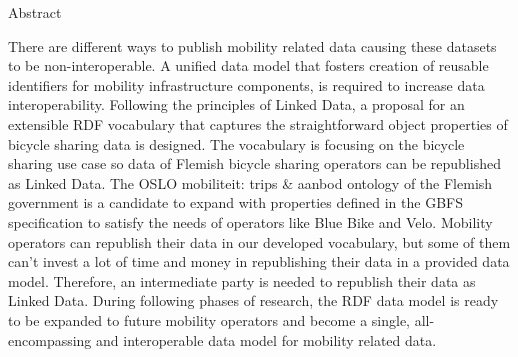 Abstract

There are different ways to publish mobility related data causing these datasets to be non-interoperable.
A unified data model that fosters creation of reusable identifiers for mobility infrastructure components, is required to increase data interoperability.
Following the principles of Linked Data, a proposal for an extensible RDF vocabulary that captures the straightforward object properties of bicycle sharing data is designed.
The vocabulary is focusing on the bicycle sharing use case so data of Flemish bicycle sharing operators can be republished as Linked Data.
The OSLO mobiliteit: trips \& aanbod ontology of the Flemish government is a candidate to expand with properties defined in the GBFS specification to satisfy the needs of operators like Blue Bike and Velo.
Mobility operators can republish their data in our developed vocabulary, but some of them can't invest a lot of time and money in republishing their data in a provided data model. Therefore, an intermediate party is needed to republish their data as Linked Data.
During following phases of research, the RDF data model is ready to be expanded to future mobility operators and become a single, all-encompassing and interoperable data model for mobility related data.